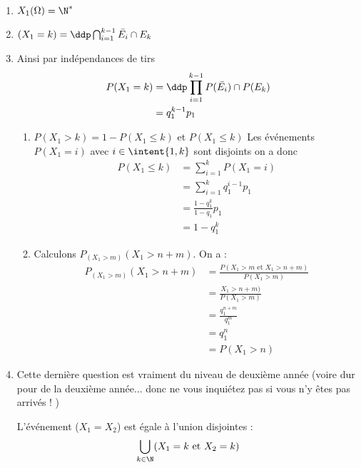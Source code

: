 \begin{correction}
\begin{enumerate}

\item $X_1(\Omega) =\N^*$
\item $(X_1= k) = \ddp \bigcap_{i=1}^{k-1} \bar{E_i} \cap E_k$

\item Ainsi par indépendances de tirs 
\begin{align*}
P(X_1= k) &= \ddp \prod_{i=1}^{k-1}P( \bar{E_i}) \cap P(E_k)\\
				&=q_1^{k-1}p_1
\end{align*}


\begin{enumerate}
\item $P(X_1>k) = 1-P(X_1 \leq k) $ et $P(X_1\leq k)$ 
Les événements $P(X_1 = i)$ avec $i\in \intent{1,k}$ sont disjoints on a donc 
\begin{align*}
P(X_1 \leq k) &= \sum_{i=1}^k P(X_1= i)\\
					& = \sum_{i=1}^k q_1^{i-1}p_1\\
					&=\frac{1-q_1^k}{1-q_1}p_1\\
					&=1-q_1^k
\end{align*}

\item Calculons $ P_{(X_1>m)} (X_1>n+m)$. On a  : 
\begin{align*}
P_{(X_1>m)} (X_1>n+m) &= \frac{P(X_1>m \text{ et } X_1>n+m)}{P(X_1>m)}\\
								&= \frac{X_1>n+m)}{P(X_1>m)}\\
								&= \frac{q_1^{n+m}}{q_1^m}\\
								&=q^n_1\\
								&= P(X_1>n)
\end{align*}

\end{enumerate}

\item Cette dernière question est vraiment du niveau de deuxième année (voire dur pour de la deuxième année... donc ne vous inquiétez pas si vous n'y êtes pas arrivés ! )

L'événement ($X_1 =X_2$) est égale à l'union disjointes  :
$$\bigcup_{k\in \N} (X_1 = k \text{ et } X_2 = k) $$


\end{enumerate}
\end{correction}
